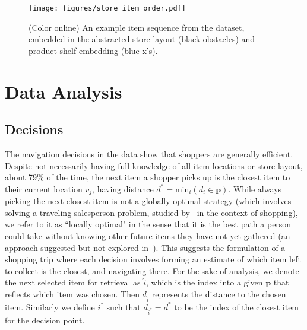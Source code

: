 \documentclass[aps,pre,twocolumn,groupedaddress]{revtex4-2}
\begin{document}


\begin{figure}
    \centering
    \texttt{[image: figures/store\_item\_order.pdf]}%
    \caption{(Color online) An example item sequence from the dataset, embedded in the abstracted store layout (black obstacles) and product shelf embedding (blue x's).\label{fig:entropy:example_match}}
\end{figure}
\section{Data Analysis\label{sec:analysis}}

\subsection{Decisions}

 The navigation decisions in the data show that shoppers are generally efficient. Despite not necessarily having full knowledge of all item locations or store layout, about 79\% of the time, the next item a shopper picks up is the closest item to their current location $v_{j}$, having distance
$d^{*} = \text{min}_{i}(d_{i}\in\mathbf{p})$. While always picking the next closest item is not a globally optimal strategy (which involves solving a traveling salesperson problem, studied by~\cite{hui2009research} in the context of shopping), we refer to it as ``locally optimal" in the sense that it is the best path a person could take without knowing other future items they have not yet gathered (an approach suggested but not explored in~\cite{hui2009path}). This suggests the formulation of a shopping trip where each decision involves forming an estimate of which item left to collect is the closest, and navigating there. For the sake of analysis, we denote the next selected item for retrieval as $\hat{i}$, which is the index into a given $\mathbf{p}$ that reflects which item was chosen. Then $d_{\hat{i}}$ represents the distance to the chosen item. Similarly we define $i^{*}$ such that $d_{i^{*}} = d^{*}$ to be the index of the closest item for the decision point.
\end{document}
